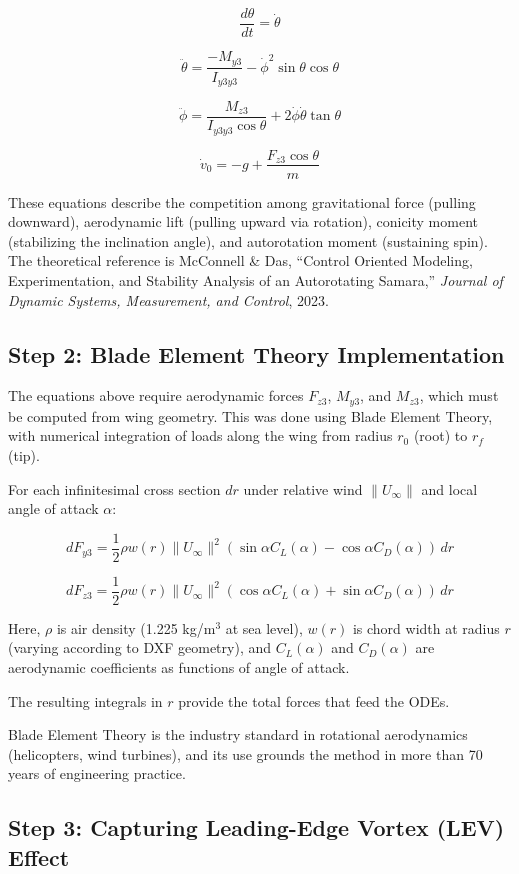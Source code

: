 \documentclass[12pt,a4paper]{article}
\begin{document}
\[
\frac{d\theta}{dt} = \dot{\theta}
\]

\[
\ddot{\theta} = \frac{-M_{y3}}{I_{y3y3}} - \dot{\phi}^2 \sin\theta \cos\theta
\]

\[
\ddot{\phi} = \frac{M_{z3}}{I_{y3y3} \cos\theta} + 2\dot{\phi}\dot{\theta} \tan\theta
\]

\[
\dot{v}_0 = -g + \frac{F_{z3} \cos\theta}{m}
\]

These equations describe the competition among gravitational force (pulling downward), aerodynamic lift (pulling upward via rotation), conicity moment (stabilizing the inclination angle), and autorotation moment (sustaining spin). The theoretical reference is McConnell \& Das, ``Control Oriented Modeling, Experimentation, and Stability Analysis of an Autorotating Samara,'' \textit{Journal of Dynamic Systems, Measurement, and Control}, 2023.

\subsection{Step 2: Blade Element Theory Implementation}

The equations above require aerodynamic forces $F_{z3}$, $M_{y3}$, and $M_{z3}$, which must be computed from wing geometry. This was done using Blade Element Theory, with numerical integration of loads along the wing from radius $r_0$ (root) to $r_f$ (tip).

For each infinitesimal cross section $dr$ under relative wind $\|U_\infty\|$ and local angle of attack $\alpha$:

\[
dF_{y3} = \frac{1}{2} \rho w(r) \|U_\infty\|^2 (\sin\alpha C_L(\alpha) - \cos\alpha C_D(\alpha)) \, dr
\]

\[
dF_{z3} = \frac{1}{2} \rho w(r) \|U_\infty\|^2 (\cos\alpha C_L(\alpha) + \sin\alpha C_D(\alpha)) \, dr
\]

Here, $\rho$ is air density (1.225 kg/m$^3$ at sea level), $w(r)$ is chord width at radius $r$ (varying according to DXF geometry), and $C_L(\alpha)$ and $C_D(\alpha)$ are aerodynamic coefficients as functions of angle of attack.

The resulting integrals in $r$ provide the total forces that feed the ODEs.

Blade Element Theory is the industry standard in rotational aerodynamics (helicopters, wind turbines), and its use grounds the method in more than 70 years of engineering practice.

\subsection{Step 3: Capturing Leading-Edge Vortex (LEV) Effect}
\end{document}
